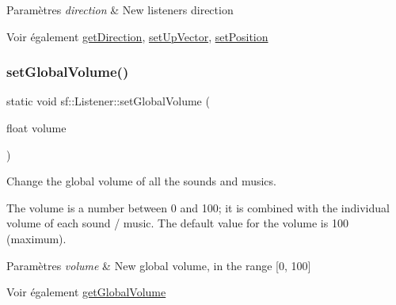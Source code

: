 \begin{DoxyParams}{Paramètres}
{\em direction} & New listener\textquotesingle{}s direction\\
\hline
\end{DoxyParams}
\begin{DoxySeeAlso}{Voir également}
\hyperlink{classsf_1_1Listener_a54e91baba51d4431474f53ff7f9309f9}{get\+Direction}, \hyperlink{classsf_1_1Listener_a0ea9b3083a994b2b90253543bc4e3ad6}{set\+Up\+Vector}, \hyperlink{classsf_1_1Listener_a5bc2d8d18ea2d8f339d23cbf17678564}{set\+Position} 
\end{DoxySeeAlso}
\mbox{\label{classsf_1_1Listener_a803a24a1fc04620cacc9f88c6fbc0e3a}} 
\subsubsection{\texorpdfstring{set\+Global\+Volume()}{setGlobalVolume()}}
{\footnotesize\ttfamily static void sf\+::\+Listener\+::set\+Global\+Volume (\begin{DoxyParamCaption}\item[{float}]{volume }\end{DoxyParamCaption})\hspace{0.3cm}{\ttfamily [static]}}



Change the global volume of all the sounds and musics. 

The volume is a number between 0 and 100; it is combined with the individual volume of each sound / music. The default value for the volume is 100 (maximum).


\begin{DoxyParams}{Paramètres}
{\em volume} & New global volume, in the range \mbox{[}0, 100\mbox{]}\\
\hline
\end{DoxyParams}
\begin{DoxySeeAlso}{Voir également}
\hyperlink{classsf_1_1Listener_a137ea535799bdf70be6ec969673d4d33}{get\+Global\+Volume} 
\end{DoxySeeAlso}
\mbox{\label{classsf_1_1Listener_a5bc2d8d18ea2d8f339d23cbf17678564}} 
